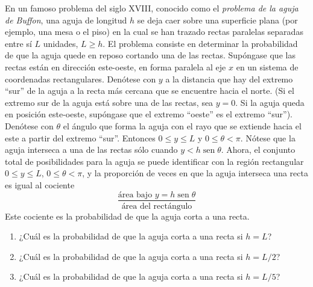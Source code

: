 \item En un famoso problema del siglo XVIII, conocido como el \textit{problema de la aguja de Buffon}, una aguja de longitud $h$ se deja caer sobre una superficie plana (por ejemplo, una mesa o el piso) en la cual se han trazado rectas paralelas separadas entre sí $L$ unidades, $L \ge h$. El problema consiste en determinar la probabilidad de que la aguja quede en reposo cortando una de las rectas. Supóngase que las rectas están en dirección este-oeste, en forma paralela al eje $x$ en un sistema de coordenadas rectangulares. Denótese con $y$ a la distancia que hay del extremo ``sur'' de la aguja a la recta más cercana que se encuentre hacia el norte. (Si el extremo sur de la aguja está sobre una de las rectas, sea $y = 0$. Si la aguja queda en posición este-oeste, supóngase que el extremo ``oeste'' es el extremo ``sur''). Denótese con $\theta$ el ángulo que forma la aguja con el rayo que se extiende hacia el este a partir del extremo ``sur''. Entonces $0 \le y \le L$ y $0 \le \theta < \pi$. Nótese que la aguja interseca a una de las rectas sólo cuando $y < h \operatorname{sen} \theta$. Ahora, el conjunto total de posibilidades para la aguja se puede identificar con la región rectangular $0 \le y \le L$, $0 \le \theta < \pi$, y la proporción de veces en que la aguja interseca una recta es igual al cociente
$$\frac{\text{área bajo } y = h \operatorname{sen} \theta}{\text{área del rectángulo}}$$
Este cociente es la probabilidad de que la aguja corta a una recta.
\begin{enumerate}
    \item[(a)] ¿Cuál es la probabilidad de que la aguja corta a una recta si $h = L$?
    \item[(b)] ¿Cuál es la probabilidad de que la aguja corta a una recta si $h = L/2$?
    \item[(c)] ¿Cuál es la probabilidad de que la aguja corta a una recta si $h = L/5$?
\end{enumerate}
